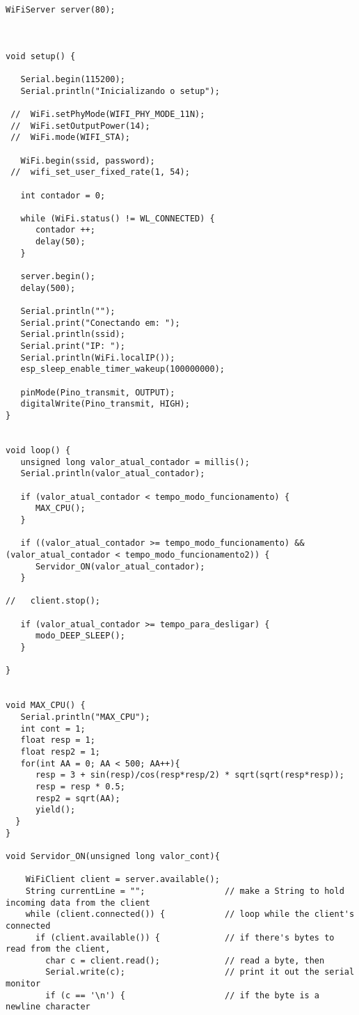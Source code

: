 \begin{lstlisting}
WiFiServer server(80);



void setup() {
  
   Serial.begin(115200);
   Serial.println("Inicializando o setup");
   
 //  WiFi.setPhyMode(WIFI_PHY_MODE_11N);
 //  WiFi.setOutputPower(14);
 //  WiFi.mode(WIFI_STA);
   
   WiFi.begin(ssid, password);
 //  wifi_set_user_fixed_rate(1, 54);
   
   int contador = 0;
   
   while (WiFi.status() != WL_CONNECTED) {
      contador ++;
      delay(50);
   }

   server.begin();
   delay(500);
   
   Serial.println("");
   Serial.print("Conectando em: ");
   Serial.println(ssid);
   Serial.print("IP: ");
   Serial.println(WiFi.localIP());
   esp_sleep_enable_timer_wakeup(100000000);

   pinMode(Pino_transmit, OUTPUT);
   digitalWrite(Pino_transmit, HIGH);
}


void loop() {
   unsigned long valor_atual_contador = millis();
   Serial.println(valor_atual_contador);
   
   if (valor_atual_contador < tempo_modo_funcionamento) {
      MAX_CPU();
   } 
   
   if ((valor_atual_contador >= tempo_modo_funcionamento) && (valor_atual_contador < tempo_modo_funcionamento2)) {
      Servidor_ON(valor_atual_contador);
   }
   
//   client.stop();
   
   if (valor_atual_contador >= tempo_para_desligar) {
      modo_DEEP_SLEEP();
   }
   
}


void MAX_CPU() {
   Serial.println("MAX_CPU");
   int cont = 1;
   float resp = 1;
   float resp2 = 1;
   for(int AA = 0; AA < 500; AA++){
      resp = 3 + sin(resp)/cos(resp*resp/2) * sqrt(sqrt(resp*resp));
      resp = resp * 0.5;
      resp2 = sqrt(AA);
      yield();
  }
}

void Servidor_ON(unsigned long valor_cont){
    
    WiFiClient client = server.available();
    String currentLine = "";                // make a String to hold incoming data from the client
    while (client.connected()) {            // loop while the client's connected
      if (client.available()) {             // if there's bytes to read from the client,
        char c = client.read();             // read a byte, then
        Serial.write(c);                    // print it out the serial monitor
        if (c == '\n') {                    // if the byte is a newline character


\end{lstlisting}
